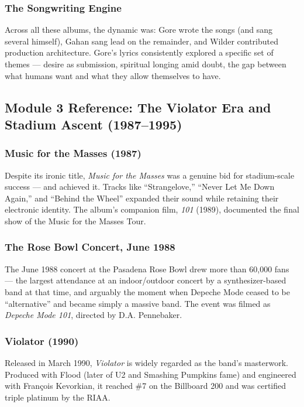 \documentclass[11pt,letterpaper]{article}
\begin{document}
\subsubsection{The Songwriting Engine}

Across all these albums, the dynamic was: Gore wrote the songs (and sang several himself), Gahan sang lead on the remainder, and Wilder contributed production architecture. Gore's lyrics consistently explored a specific set of themes --- desire as submission, spiritual longing amid doubt, the gap between what humans want and what they allow themselves to have.

\subsection{Module 3 Reference: The Violator Era and Stadium Ascent (1987--1995)}

\subsubsection{Music for the Masses (1987)}

Despite its ironic title, \textit{Music for the Masses} was a genuine bid for stadium-scale success --- and achieved it. Tracks like ``Strangelove,'' ``Never Let Me Down Again,'' and ``Behind the Wheel'' expanded their sound while retaining their electronic identity. The album's companion film, \textit{101} (1989), documented the final show of the Music for the Masses Tour.

\subsubsection{The Rose Bowl Concert, June 1988}

The June 1988 concert at the Pasadena Rose Bowl drew more than 60,000 fans --- the largest attendance at an indoor/outdoor concert by a synthesizer-based band at that time, and arguably the moment when Depeche Mode ceased to be ``alternative'' and became simply a massive band. The event was filmed as \textit{Depeche Mode 101}, directed by D.A. Pennebaker.

\subsubsection{Violator (1990)}

Released in March 1990, \textit{Violator} is widely regarded as the band's masterwork. Produced with Flood (later of U2 and Smashing Pumpkins fame) and engineered with François Kevorkian, it reached \#7 on the Billboard 200 and was certified triple platinum by the RIAA.
\end{document}
